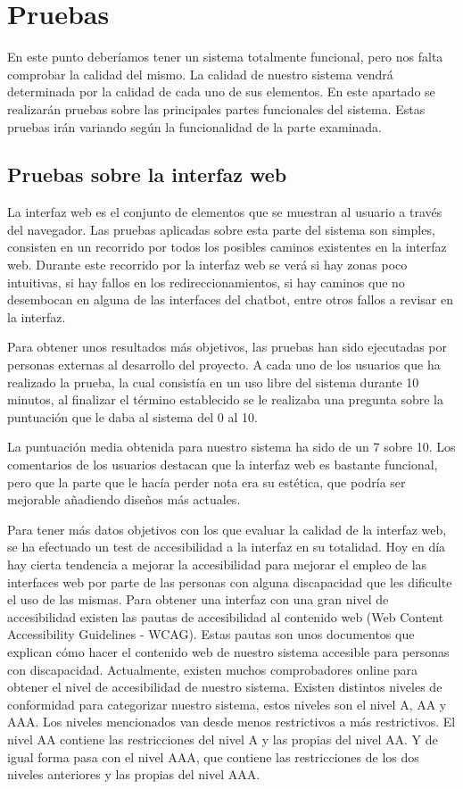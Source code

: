 \chapter{Pruebas} \label{pruebas}

En este punto deberíamos tener un sistema totalmente funcional, pero nos falta comprobar la calidad del mismo. La calidad de nuestro sistema vendrá determinada por la calidad de cada uno de sus elementos. En este apartado se realizarán pruebas sobre las principales partes funcionales del sistema. Estas pruebas irán variando según la funcionalidad de la parte examinada.

\section{Pruebas sobre la interfaz web}

La interfaz web es el conjunto de elementos que se muestran al usuario a través del navegador. Las pruebas aplicadas sobre esta parte del sistema son simples, consisten en un recorrido por todos los posibles caminos existentes en la interfaz web. Durante este recorrido por la interfaz web se verá si hay zonas poco intuitivas, si hay fallos en los redireccionamientos, si hay caminos que no desembocan en alguna de las interfaces del chatbot, entre otros fallos a revisar en la interfaz.

Para obtener unos resultados más objetivos, las pruebas han sido ejecutadas por personas externas al desarrollo del proyecto. A cada uno de los usuarios que ha realizado la prueba, la cual consistía en un uso libre del sistema durante 10 minutos, al finalizar el término establecido se le realizaba una pregunta sobre la puntuación que le daba al sistema del 0 al 10.

La puntuación media obtenida para nuestro sistema ha sido de un 7 sobre 10. Los comentarios de los usuarios destacan que la interfaz web es bastante funcional, pero que la parte que le hacía perder nota era su estética, que podría ser mejorable añadiendo diseños más actuales.

Para tener más datos objetivos con los que evaluar la calidad de la interfaz web, se ha efectuado un test de accesibilidad a la interfaz en su totalidad. Hoy en día hay cierta tendencia a mejorar la accesibilidad para mejorar el empleo de las interfaces web por parte de las personas con alguna discapacidad que les dificulte el uso de las mismas. Para obtener una interfaz con una gran nivel de accesibilidad existen las pautas de accesibilidad al contenido web (Web Content Accessibility Guidelines - WCAG). Estas pautas son unos documentos que explican cómo hacer el contenido web de nuestro sistema accesible para personas con discapacidad. Actualmente, existen muchos comprobadores online para obtener el nivel de accesibilidad de nuestro sistema. Existen distintos niveles de conformidad para categorizar nuestro sistema, estos niveles son el nivel A, AA y AAA. Los niveles mencionados van desde menos restrictivos a más restrictivos. El nivel AA contiene las restricciones del nivel A y las propias del nivel AA. Y de igual forma pasa con el nivel AAA, que contiene las restricciones de los dos niveles anteriores y las propias del nivel AAA.

